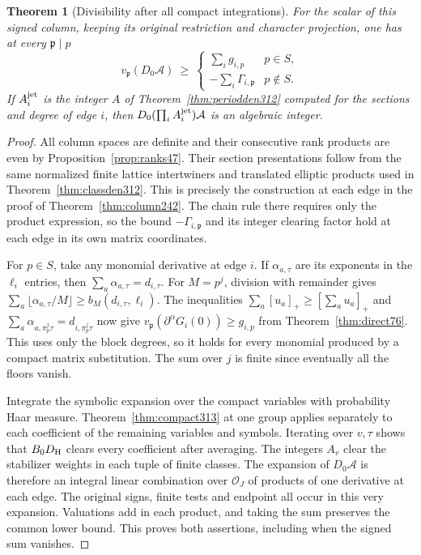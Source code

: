 \documentclass[a4paper,11pt]{article}
\newtheorem{theorem}[proposition]{Theorem}
\theoremstyle{definition}
\theoremstyle{remark}
\numberwithin{equation}{section}
\newcommand{\OO}{\mathcal O}
\begin{document}
\begin{theorem}[Divisibility after all compact integrations]\leavevmode
\label{thm:finitecolumn313}
For the scalar of this signed column, keeping its original
restriction and character projection, one has at every
\(\mathfrak p\mid p\)
\[
 v_{\mathfrak p}(D_0\mathcal A)\ \ge\
 \begin{cases}
    \sum_i g_{i,p} &p\in S,\\
    -\sum_i\Gamma_{i,\mathfrak p} &p\notin S.
 \end{cases}
\]
If \(A_i^{\rm jet}\) is the integer \(A\) of
Theorem~\ref{thm:periodden312} computed for the sections and degree
of edge \(i\), then \(D_0(\prod_i A_i^{\rm jet})\mathcal A\)
is an algebraic integer.
\end{theorem}
\begin{proof}
All column spaces are definite and their consecutive rank products
are even by Proposition~\ref{prop:ranks47}. Their section
presentations follow from the same normalized finite lattice
intertwiners and translated elliptic products used in
Theorem~\ref{thm:classden312}. This is precisely the construction
at each edge in the proof of Theorem~\ref{thm:column242}. The
chain rule there requires only the product expression, so the
bound \(-\Gamma_{i,\mathfrak p}\) and its integer clearing factor
hold at each edge in its own matrix coordinates.

For \(p\in S\), take any monomial derivative at edge \(i\). If
\(\alpha_{a,\tau}\) are its exponents in the \(\ell_i\) entries,
then \(\sum_a\alpha_{a,\tau}=d_{i,\tau}\).
For \(M=p^j\), division with remainder gives
\(\sum_a\lfloor\alpha_{a,\tau}/M\rfloor
\ge b_M(d_{i,\tau},\ell_i)\). The inequalities
\(\sum_a[u_a]_+\ge[\sum_a u_a]_+\) and
\(\sum_a\alpha_{a,\pi_p^j\tau}=d_{i,\pi_p^j\tau}\) now give
\(v_{\mathfrak p}(\partial^\alpha G_i(0))\ge g_{i,p}\) from
Theorem~\ref{thm:direct76}. This uses only the block degrees,
so it holds for every monomial produced by a compact matrix
substitution. The sum over \(j\) is finite since eventually
all the floors vanish.

Integrate the symbolic expansion over the compact variables
with probability Haar measure. Theorem~\ref{thm:compact313}
at one group applies separately to each coefficient of the
remaining variables and symbols. Iterating over \(v,\tau\)
shows that \(B_0D_{\rm H}\) clears every coefficient after
averaging. The integers \(A_v\) clear the stabilizer weights in
each tuple of finite classes. The expansion of
\(D_0\mathcal A\) is therefore an integral linear combination
over \(\OO_J\) of products of one derivative at each edge.
The original signs, finite tests and endpoint all occur in this
very expansion. Valuations add in each product, and taking
the sum preserves the common lower bound. This proves both
assertions, including when the signed sum vanishes.
\end{proof}
\end{document}
